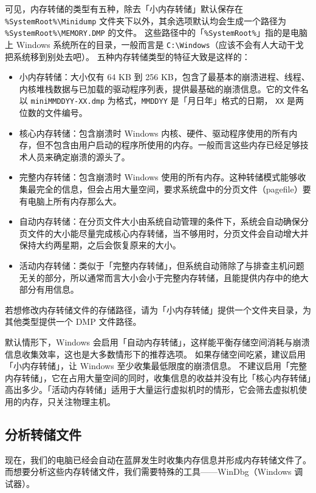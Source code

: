 可见，内存转储的类型有五种，除去「小内存转储」默认保存在 \verb|%SystemRoot%\Minidump| 文件夹下以外，其余选项默认均会生成一个路径为 \verb|%SystemRoot%\MEMORY.DMP| 的文件。
这些路径中的「\verb|%SystemRoot%|」指的是电脑上 Windows 系统所在的目录，一般而言是 \verb|C:\Windows|（应该不会有人大动干戈把系统移到别处去吧）。
五种内存转储类型的特征大致是这样的：

\begin{itemize}
  \item 小内存转储：大小仅有 64 KB 到 256 KB，包含了最基本的崩溃进程、线程、内核堆栈数据与已加载的驱动程序列表，提供最基础的崩溃信息。它的文件名以 \verb|miniMMDDYY-XX.dmp| 为格式，\verb|MMDDYY| 是「月日年」格式的日期， \verb|XX| 是两位数的文件编号。
  \item 核心内存转储：包含崩溃时 Windows 内核、硬件、驱动程序使用的所有内存，但不包含由用户启动的程序所使用的内存。一般而言这些内存已经足够技术人员来确定崩溃的源头了。
  \item 完整内存转储：包含崩溃时 Windows 使用的所有内存。这种转储模式能够收集最完全的信息，但会占用大量空间，要求系统盘中的分页文件（pagefile）要有电脑上所有内存那么大。
  \item 自动内存转储：在分页文件大小由系统自动管理的条件下，系统会自动确保分页文件的大小能尽量完成核心内存转储，当不够用时，分页文件会自动增大并保持大约两星期，之后会恢复原来的大小。
  \item 活动内存转储：类似于「完整内存转储」，但系统自动筛除了与排查主机问题无关的部分，所以通常而言大小会小于完整内存转储，且能提供内存中的绝大部分有用信息。
\end{itemize}

若想修改内存转储文件的存储路径，请为「小内存转储」提供一个文件夹目录，为其他类型提供一个 DMP 文件路径。

默认情形下，Windows 会启用「自动内存转储」，这样能平衡存储空间消耗与崩溃信息收集效率，这也是大多数情形下的推荐选项。
如果存储空间吃紧，建议启用「小内存转储」，让 Windows 至少收集最低限度的崩溃信息。
不建议启用「完整内存转储」，它在占用大量空间的同时，收集信息的收益并没有比「核心内存转储」高出多少。「活动内存转储」适用于大量运行虚拟机时的情形，它会筛去虚拟机使用的内存，只关注物理主机。

\subsection{分析转储文件}

现在，我们的电脑已经会自动在蓝屏发生时收集内存信息并形成内存转储文件了。
而想要分析这些内存转储文件，我们需要特殊的工具——WinDbg（Windows 调试器）。

